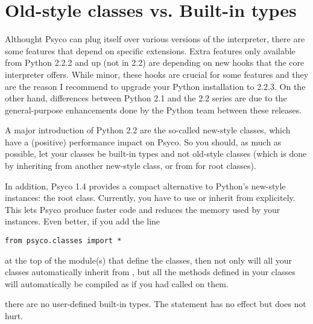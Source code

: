 \documentclass{manual}
\begin{document}
\section{Old-style classes vs. Built-in types}\label{metaclass}

Althought Psyco can plug itself over various versions of the interpreter, there are some features that depend on specific extensions.  Extra features only available from Python 2.2.2 and up (not in 2.2) are depending on new hooks that the core interpreter offers.  While minor, these hooks are crucial for some features and they are the reason I recommend to upgrade your Python installation to 2.2.3.  On the other hand, differences between Python 2.1 and the 2.2 series are due to the general-purpose enhancements done by the Python team between these releases.

A major introduction of Python 2.2 are the so-called new-style classes, which have a (positive) performance impact on Psyco.  So  you should, as much as possible, let your classes be built-in types and not old-style classes (which is done by inheriting from another new-style class, or from  for root classes).

In addition, Psyco 1.4 provides a compact alternative to Python's new-style instances: the  root class.  Currently, you have to use or inherit from  explicitely.  This lets Psyco produce faster code and reduces the memory used by your instances.  Even better, if you add the line

\begin{verbatim}
from psyco.classes import *
\end{verbatim}

at the top of the module(s) that define the classes, then not only will all your classes automatically inherit from , but all the methods defined in your classes will automatically be compiled as if you had called  on them.


 there are no user-defined built-in types.  The statement  has no effect but does not hurt.
\end{document}
